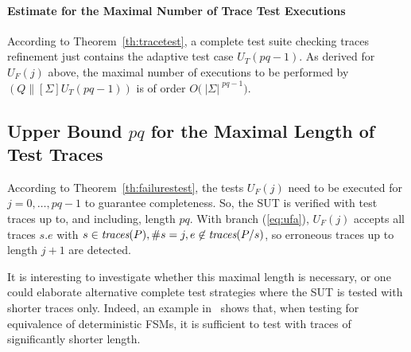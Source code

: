 \documentclass[3p,times]{elsarticle}
\newcommand{\trc}{\text{\it traces}}
\newcommand{\card}[1]{{~|\! #1\!|~}}
\begin{document}
\paragraph{Estimate for the Maximal Number of Trace Test Executions}
According to Theorem~\ref{th:tracetest}, a complete test suite checking
traces refinement just contains the adaptive test case $U_T(pq-1)$. As
derived for $U_F(j)$ above, the maximal number of executions to be performed
by $(Q\parallel[\Sigma] U_T(pq-1))$ is of order
$O\big(\card{\Sigma}^{pq-1}\big)$.

\subsection{Upper Bound $pq$ for the Maximal Length of Test Traces}
\label{section:complexity:length}

According to Theorem~\ref{th:failurestest}, the tests $U_F(j)$ need to be
executed for $j = 0,\dots,pq-1$ to guarantee completeness. So, the SUT is
verified with test traces up to, and including, length $pq$. With branch
(\ref{eq:ufa}), $U_F(j)$ accepts all traces $s.e$ with $s\in\trc(P), \#s
= j, e\not\in\trc(P/s)$, so erroneous traces up to length $j+1$ are detected.

It is interesting to investigate whether this maximal length is necessary, or
one could elaborate alternative complete test strategies where the
SUT is tested with shorter traces only. Indeed, an example
in~\cite[Exercise~5]{PeleskaHuangLectureNotesMBT} shows that, when testing
for equivalence of deterministic FSMs, it is sufficient to test with
traces of significantly shorter length.
\end{document}
